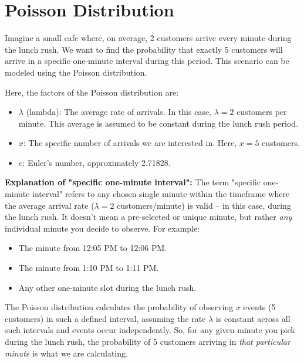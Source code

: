 \chapter{Poisson Distribution}
\label{chap:poisson-distribution}

\begin{eg}
  \label{ex:cafe-customers}
  Imagine a small cafe where, on average, 2 customers arrive every minute during the lunch rush. We want to find the probability that exactly 5 customers will arrive in a specific one-minute interval during this period. This scenario can be modeled using the Poisson distribution.

  Here, the factors of the Poisson distribution are:
  \begin{itemize}
    \item \(\lambda\) (lambda): The average rate of arrivals. In this case, \(\lambda = 2\) customers per minute. This average is assumed to be constant during the lunch rush period.
    \item \(x\): The specific number of arrivals we are interested in. Here, \(x = 5\) customers.
    \item \(e\): Euler's number, approximately 2.71828.
  \end{itemize}

  \textbf{Explanation of "specific one-minute interval":}
  The term "specific one-minute interval" refers to any chosen single minute
  within the timeframe where the average arrival rate (\(\lambda=2\)
  customers/minute) is valid – in this case, during the lunch rush. It
  doesn't mean a pre-selected or unique minute, but rather \emph{any} individual minute you decide to observe. For example:
  \begin{itemize}
    \item The minute from 12:05 PM to 12:06 PM.
    \item The minute from 1:10 PM to 1:11 PM.
    \item Any other one-minute slot during the lunch rush.
  \end{itemize}
  The Poisson distribution calculates the probability of observing \(x\) events (5 customers) in such a defined interval, assuming the rate \(\lambda\) is constant across all such intervals and events occur independently. So, for any given minute you pick during the lunch rush, the probability of 5 customers arriving in \emph{that particular minute} is what we are calculating.


\end{eg}
